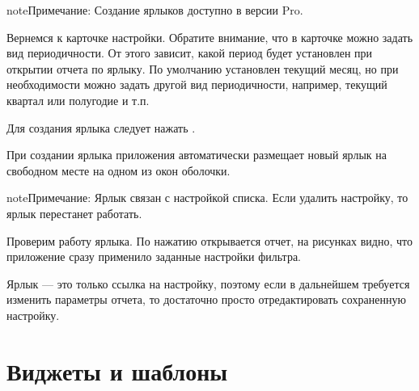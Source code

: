 \documentclass[a4paper,10pt,russian]{sphinxmanual}
\begin{document}
\begin{sphinxadmonition}{note}{Примечание:}
\sphinxAtStartPar
Создание ярлыков доступно в версии Pro.
\end{sphinxadmonition}

\sphinxAtStartPar
Вернемся к карточке настройки. Обратите внимание, что в карточке можно задать вид периодичности. От этого зависит,
какой период будет установлен при открытии отчета по ярлыку. По умолчанию установлен текущий месяц, но при
необходимости можно задать другой вид периодичности, например, текущий квартал или полугодие и т.п.

\sphinxAtStartPar
Для создания ярлыка следует нажать .

\noindent{}

\noindent{}

\sphinxAtStartPar
При создании ярлыка приложения автоматически размещает новый ярлык на свободном месте на одном из окон оболочки.

\begin{sphinxadmonition}{note}{Примечание:}
\sphinxAtStartPar
Ярлык связан с настройкой списка. Если удалить настройку, то ярлык перестанет работать.
\end{sphinxadmonition}

\noindent{}

\noindent{}

\noindent{}

\sphinxAtStartPar
Проверим работу ярлыка. По нажатию открывается отчет, на рисунках видно, что приложение сразу применило заданные
настройки фильтра.

\sphinxAtStartPar
Ярлык — это только ссылка на настройку, поэтому если в дальнейшем требуется изменить параметры отчета,
то достаточно просто отредактировать сохраненную настройку.

\sphinxstepscope


\chapter{Виджеты и шаблоны}
\label{\detokenize{widgets:chapter-widgets}}\label{\detokenize{widgets:id1}}\label{\detokenize{widgets::doc}}
\end{document}
